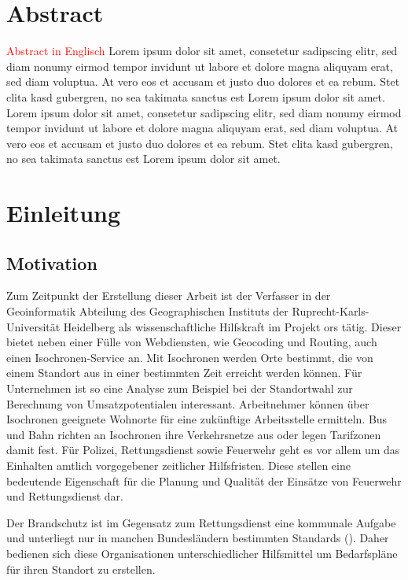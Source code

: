\documentclass[12pt,a4paper]{article}
\newcommand\todo[1]{\textcolor{red}{#1}}
\begin{document}
\newpage
{\centering\section*{Abstract}}
\todo{Abstract in Englisch}
Lorem ipsum dolor sit amet, consetetur sadipscing elitr, sed diam nonumy eirmod tempor invidunt ut labore et dolore magna aliquyam erat, sed diam voluptua. At vero eos et accusam et justo duo dolores et ea rebum. Stet clita kasd gubergren, no sea takimata sanctus est Lorem ipsum dolor sit amet. Lorem ipsum dolor sit amet, consetetur sadipscing elitr, sed diam nonumy eirmod tempor invidunt ut labore et dolore magna aliquyam erat, sed diam voluptua. At vero eos et accusam et justo duo dolores et ea rebum. Stet clita kasd gubergren, no sea takimata sanctus est Lorem ipsum dolor sit amet.

\newpage
\tableofcontents

\newpage
\listoffigures

\printglossary[type=\acronymtype, title=Abkürzungsverzeichnis, toctitle=Abkürzungsverzeichnis]

\newpage
{}
\section{Einleitung}

\subsection{Motivation}
Zum Zeitpunkt der Erstellung dieser Arbeit ist der Verfasser in der Geoinformatik Abteilung des Geographischen Instituts der Ruprecht-Karls-Universität Heidelberg als wissenschaftliche Hilfskraft im Projekt \gls{ors} tätig. Dieser bietet neben einer Fülle von Webdiensten, wie Geocoding und Routing, auch einen Isochronen-Service an. Mit Isochronen werden Orte bestimmt, die von einem Standort aus in einer bestimmten Zeit erreicht werden können. Für Unternehmen ist so eine Analyse zum Beispiel bei der Standortwahl zur Berechnung von Umsatzpotentialen interessant. Arbeitnehmer können über Isochronen geeignete Wohnorte für eine zukünftige Arbeitsstelle ermitteln. Bus und Bahn richten an Isochronen ihre Verkehrsnetze aus oder legen Tarifzonen damit fest.
Für Polizei, Rettungsdienst sowie Feuerwehr geht es vor allem um das Einhalten amtlich vorgegebener zeitlicher Hilfsfristen. Diese stellen eine bedeutende Eigenschaft für die Planung und Qualität der Einsätze von Feuerwehr und Rettungsdienst dar.\par
Der Brandschutz ist im Gegensatz zum Rettungsdienst eine kommunale Aufgabe und unterliegt nur in manchen Bundesländern bestimmten Standards (\cite{bedarfsplan}). Daher bedienen sich diese Organisationen unterschiedlicher Hilfsmittel um Bedarfspläne für ihren Standort zu erstellen.
\medskip
\end{document}
